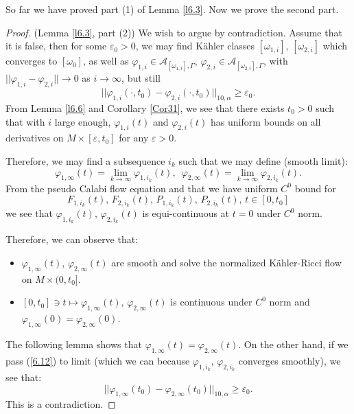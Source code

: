 \documentclass[11pt]{amsart}
\numberwithin{equation}{section}
\newcommand \eps{\varepsilon}
\begin{document}
So far we have proved part (1) of Lemma \ref{l6.3}.
Now we prove the second part.
\begin{proof}
(Lemma \ref{l6.3},  part (2)) We wish to argue by contradiction.  Assume that it is false,  then for some $\eps_0>0$,  we may find K\"ahler classes $[\omega_{1,i}],\,[\omega_{2,i}]$ which converges to $[\omega_0]$, as well as $\varphi_{1,i}\in \mathcal{A}_{[\omega_{1,i}],\Gamma}$,  $\varphi_{2,i}\in \mathcal{A}_{[\omega_{2,i}],\Gamma}$,  with $||\varphi_{1,i}-\varphi_{2,i}||\rightarrow 0$ as $i\rightarrow \infty$,  but still 
\begin{equation}\label{6.12}
||\varphi_{1,i}(\cdot,t_0)-\varphi_{2,i}(\cdot,t_0)||_{10,\alpha}\ge \eps_0.
\end{equation}
From Lemma \ref{l6.6} and Corollary \ref{Cor31},  we see that there exists $t_0>0$ such that with $i$ large enough,  $\varphi_{1,i}(t)$ and $\varphi_{2,i}(t)$ has uniform bounds on all derivatives on $M\times [\eps,t_0]$ for any $\eps>0$.  

Therefore,  we may find a subsequence $i_k$ such that we may define (smooth limit):
\begin{equation*}
\varphi_{1,\infty}(t)=\lim_{k\rightarrow \infty}\varphi_{1,i_k}(t),\,\,\,\varphi_{2,\infty}(t)=\lim_{k\rightarrow \infty}\varphi_{2,i_k}(t).
\end{equation*}
From the pseudo Calabi flow equation and that we have uniform $C^0$ bound for 
\begin{equation*}
	F_{1,i_k}(t),\,F_{2,i_k}(t),\,P_{1,i_k}(t),\,P_{2,i_k}(t),\,t\in [0,t_0]
\end{equation*} 
we see that $\varphi_{1,i_k}(t),\,\varphi_{2,i_k}(t)$ is equi-continuous at $t=0$ under $C^0$ norm.  

Therefore,  we can observe that:
\begin{itemize}
\item $\varphi_{1,\infty}(t),\,\varphi_{2,\infty}(t)$ are smooth and solve the normalized K\"ahler-Ricci flow on $M\times (0,t_0]$.
\item $[0,t_0]\ni t\mapsto \varphi_{1,\infty}(t),\,\varphi_{2,\infty}(t)$ is continuous under $C^0$ norm and $\varphi_{1,\infty}(0)=\varphi_{2,\infty}(0)$.
\end{itemize}
The following lemma shows that $\varphi_{1,\infty}(t)=\varphi_{2,\infty}(t)$.  On the other hand,  if we pass (\ref{6.12}) to limit (which we can because $\varphi_{1,i_k},\,\varphi_{2,i_k}$ converges smoothly),  we see that:
\begin{equation*}
||\varphi_{1,\infty}(t_0)-\varphi_{2,\infty}(t_0)||_{10,\alpha}\ge \eps_0.
\end{equation*}
This is a contradiction.  
\end{proof}
\end{document}
